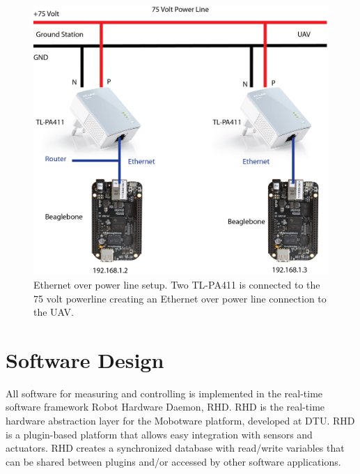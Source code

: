 \begin{figure}[hbtp]
\centering
\includegraphics[scale=0.75]{graphics/EthernetLink.png}
\caption[Ethernet over power line setup]{Ethernet over power line setup. Two TL-PA411 is connected to the 75 volt powerline creating an Ethernet over power line connection to the UAV.}
\label{fig:Networking}
\end{figure}



\section{Software Design}
All software for measuring and controlling is implemented in the real-time software framework Robot Hardware Daemon, RHD. RHD is the real-time hardware abstraction layer for the Mobotware platform, developed at DTU. RHD is a plugin-based platform that allows easy integration with sensors and actuators. RHD creates a synchronized database with read/write variables that can be shared between plugins and/or accessed by other software applications.

